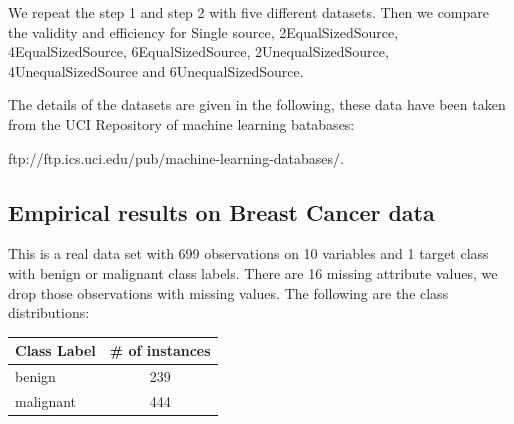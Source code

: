 \documentclass[main]{subfiles}
\begin{document}
We repeat the step 1 and step 2 with five different datasets. Then we compare the validity and efficiency for Single source, 2EqualSizedSource, 4EqualSizedSource, 6EqualSizedSource, 2UnequalSizedSource, 4UnequalSizedSource and 6UnequalSizedSource. 

The details of the datasets are given in the following, these data have been taken from the UCI Repository of machine learning batabases: 

ftp://ftp.ics.uci.edu/pub/machine-learning-databases/.

\subsection{Empirical results on Breast Cancer data}
This is a real data set with 699 observations on 10 variables and 1 target class with benign or malignant class labels. There are 16 missing attribute values, we drop those observations with missing values. The following are the class distributions:

\begin{center}

\begin{tabular}{l|c}
Class Label & \# of instances \\
\toprule
benign &  239\\
malignant &  444\\
\end{tabular}
\end{center}
\end{document}
